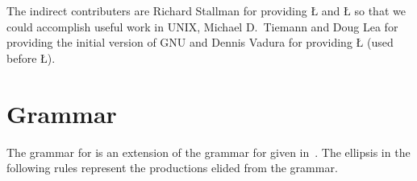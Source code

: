 \documentclass[openright,twoside]{report}
\begin{document}
The indirect contributers are Richard Stallman for providing \LGinlinetrue\LGbegin\lgrinde\L{}\endlgrinde\LGend{} and \LGinlinetrue\LGbegin\lgrinde\L{}\endlgrinde\LGend{} so that we could accomplish useful work in UNIX, Michael D.~Tiemann and Doug Lea for providing the initial version of GNU \CC and Dennis Vadura for providing \LGinlinetrue\LGbegin\lgrinde\L{}\endlgrinde\LGend{} (used before \LGinlinetrue\LGbegin\lgrinde\L{}\endlgrinde\LGend{}).


\appendix


\chapter{\texorpdfstring{\uC Grammar}{uC++ Grammar}}
\label{c:uC++Grammar}

The grammar for \uC is an extension of the grammar for \CC given in~\cite[Annex A]{ANSI98:C++}.
The ellipsis in the following rules represent the productions elided from the \CC grammar.
\end{document}
